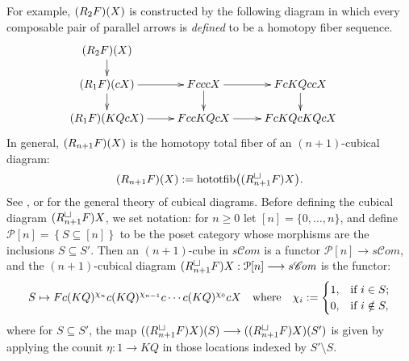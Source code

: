 \documentclass[11pt]{amsart}
\theoremstyle{plain}
\theoremstyle{definition}
\renewcommand{\to}{\longrightarrow}
\newcommand{\scrC}{\mathscr{C}}
\newcommand{\calP}{\mathcal{P}}
\theoremstyle{plain}
\newcommand{\algcat}{{\scrC\!\textit{om}}}%
\newcommand{\dupdown}[2]{R_{\smash{#1}}}
\newcommand{\plainD}{R}
\begin{document}
\begin{Bousfield-Kan spectral sequence}
For example, $(\dupdown{2}{c}F)(X)$ is constructed by the following diagram in which every composable pair of parallel arrows is \emph{defined} to be a homotopy fiber sequence.
\[\def\labelstyle{\scriptstyle}
\xymatrix@!0@R=30pt@C=43pt{
(\dupdown{2}{c}F)(X)\ar[d]\\
(\dupdown{1}{c}F)(cX) \ar[rr]\ar[d]         &           &FcccX \ar[rr]\ar[d]         &           &   FcKQccX            \ar[d]  &                  \\
(\dupdown{1}{c}F)(KQcX) \ar[rr] &                     &  FccKQcX \ar[rr] &             & FcKQcKQcX
}\]
In general, $(\dupdown{n+1}{c}F)(X)$ is the homotopy total fiber of an $(n+1)$-cubical diagram:
\[(\dupdown{n+1}{c}F)(X):=\textup{hototfib} \bigl(({\plainD}_{n+1}^{\smash{\square}}F)X\bigr).\]
See \cite{GoodwillieCalcII}, \cite{LuisGoodwillie.pdf} or \cite{CubicalHomotopyTheory.pdf} for the general theory of cubical diagrams. Before defining the cubical diagram $({\plainD}_{n+1}^{\smash{\square}}F)X$, we set notation: for $n\geq0$ let $[n]=\{0,\ldots,n\}$, and define $\calP[n]=\left\{S\subseteq [n]\right\}$ to be the poset category whose morphisms are the inclusions $S\subseteq S'$. Then an $(n+1)$-cube in $s\algcat$ is a functor $\calP[n]\to s\algcat$, and the $(n+1)$-cubical diagram $({\plainD}_{n+1}^{\smash{\square}}F)X:\calP[n]\to s\algcat$ is the functor:
\[S\mapsto Fc(KQ)^{\chi_{n}}c(KQ)^{\chi_{n-1}}c\cdots c(KQ)^{\chi_0}cX\quad \textup{where}\quad \chi_i:=\begin{cases}
1,&\textup{if }i\in S;\\
0,&\textup{if }i\notin S,
\end{cases}
\]
where for $S\subseteq S'$, the map $(({\plainD}_{n+1}^{\smash{\square}}F)X)(S)\to (({\plainD}_{n+1}^{\smash{\square}}F)X)(S')$ is given by applying the counit $\eta:1\to KQ$ in those locations indexed by $S'\setminus S$.



\end{Bousfield-Kan spectral sequence}
\end{document}

